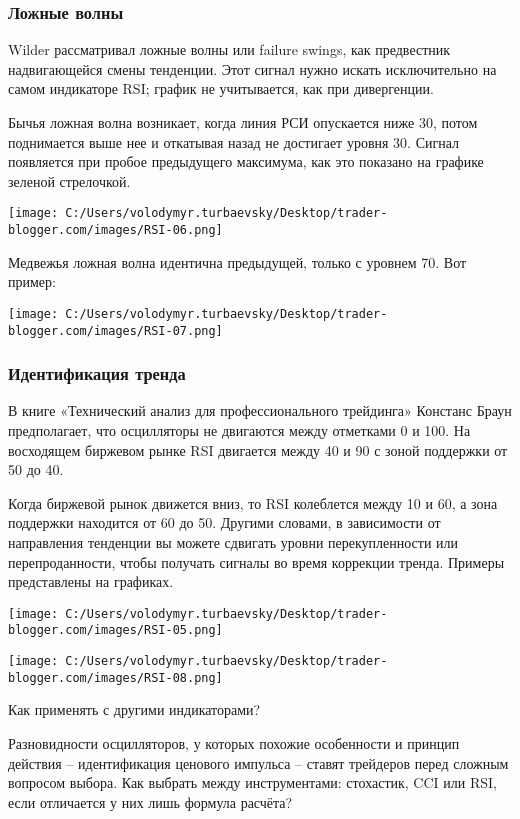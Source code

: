 \documentclass[a5paper]{article}
\begin{document}
\subsubsection{Ложные волны}

Wilder рассматривал ложные волны или failure swings, как предвестник надвигающейся смены тенденции. Этот сигнал нужно искать исключительно на самом индикаторе RSI; график не учитывается, как при дивергенции.

Бычья ложная волна возникает, когда линия РСИ опускается ниже 30,
потом поднимается выше нее и откатывая назад не достигает уровня
30. Сигнал появляется при пробое предыдущего максимума, как это
показано на графике зеленой стрелочкой.

\texttt{[image: C:/Users/volodymyr.turbaevsky/Desktop/trader-blogger.com/images/RSI-06.png]}

Медвежья ложная волна идентична предыдущей, только с уровнем 70. Вот
пример:

\texttt{[image: C:/Users/volodymyr.turbaevsky/Desktop/trader-blogger.com/images/RSI-07.png]}

\subsubsection{Идентификация тренда}

В книге «Технический анализ для профессионального трейдинга» Констанс Браун предполагает, что осцилляторы не двигаются между отметками 0 и 100. На восходящем биржевом рынке RSI двигается между 40 и 90 с зоной поддержки от 50 до 40.

Когда биржевой рынок движется вниз, то RSI колеблется между 10 и 60, а зона поддержки находится от 60 до 50. Другими словами, в зависимости от направления тенденции вы можете сдвигать уровни перекупленности или перепроданности, чтобы получать сигналы во время коррекции тренда. Примеры представлены на графиках.

\texttt{[image: C:/Users/volodymyr.turbaevsky/Desktop/trader-blogger.com/images/RSI-05.png]}

\texttt{[image: C:/Users/volodymyr.turbaevsky/Desktop/trader-blogger.com/images/RSI-08.png]}

Как применять с другими индикаторами?

Разновидности осцилляторов, у которых похожие особенности и принцип действия – идентификация ценового импульса – ставят трейдеров перед сложным вопросом выбора. Как выбрать между инструментами: стохастик, CCI или RSI, если отличается у них лишь формула расчёта?
\end{document}
